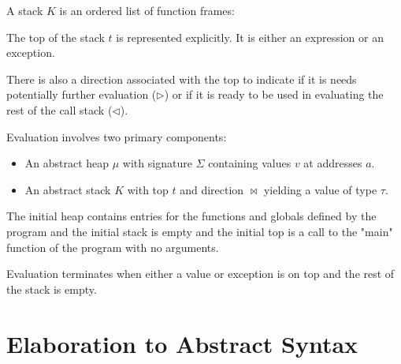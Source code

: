 \classF

A stack $K$ is an ordered list of function frames:

\classK

The top of the stack $t$ is represented explicitly. It is either an expression
or an exception.

\classt

There is also a direction associated with the top to indicate if it is needs
potentially further evaluation ($\rhd$) or if it is ready to be used in
evaluating the rest of the call stack ($\lhd$).

\classbowtie

Evaluation involves two primary components:

\begin{itemize}

\item An abstract heap $\mu$ with signature $\Sigma$ containing values $v$ at
addresses $a$.

\item An abstract stack $K$ with top $t$ and direction $\bowtie$ yielding a value of type $\tau$.

\end{itemize}

The initial heap contains entries for the functions and globals defined by the
program and the initial stack is empty and the initial top is a call to the
"main" function of the program with no arguments.

Evaluation terminates when either a value or exception is on top and the rest of
the stack is empty.

\section{Elaboration to Abstract Syntax}

